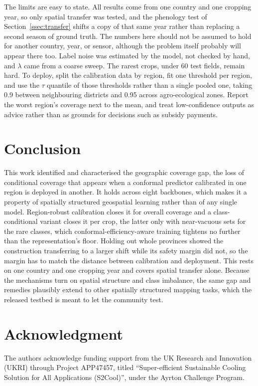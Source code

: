 \documentclass[conference]{IEEEtran}
\begin{document}
The limits are easy to state. All results come from one country and one cropping year,
so only spatial transfer was tested, and the phenology test of
Section~\ref{ssec:transfer} shifts a copy of that same year rather than replacing a
second season of ground truth. The numbers here should not be assumed to hold for
another country, year, or sensor, although the problem itself probably will appear
there too. Label noise was estimated by the model, not checked by hand, and $\lambda$
came from a coarse sweep. The rarest crops, under 60 test fields, remain hard. To
deploy, split the calibration data by region, fit one threshold per region, and use
the $\tau$ quantile of those thresholds rather than a single pooled one, taking 0.9
between neighbouring districts and 0.95 across agro-ecological zones. Report the worst
region's coverage next to the mean, and treat low-confidence outputs as advice rather
than as grounds for decisions such as subsidy payments.

\section{Conclusion}
This work identified and characterised the geographic coverage gap, the loss of
conditional coverage that appears when a conformal predictor calibrated in one region
is deployed in another. It holds across eight backbones, which makes it a property of
spatially structured geospatial learning rather than of any single model.
Region-robust calibration closes it for overall coverage and a class-conditional
variant closes it per crop, the latter only with near-vacuous sets for the rare
classes, which conformal-efficiency-aware training tightens no further than the
representation's floor. Holding out whole provinces showed the construction
transferring to a larger shift while its safety margin did not, so the margin has to
match the distance between calibration and deployment. This rests on one country and
one cropping year and covers spatial transfer alone. Because the mechanisms turn on
spatial structure and class imbalance, the same gap and remedies plausibly extend to
other spatially structured mapping tasks, which the released testbed is meant to let
the community test.

\section*{Acknowledgment}
The authors acknowledge funding support from the UK Research and Innovation (UKRI)
through Project APP47457, titled ``Super-efficient Sustainable Cooling Solution for
All Applications (S2Cool)'', under the Ayrton Challenge Program.



\end{document}
